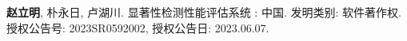 \begin{publications}
\begin{enumerate}[label={[\arabic*]}]
	\item\textbf{赵立明}, 朴永日, 卢湖川.
	显著性检测性能评估系统
	: 中国. 发明类别: 软件著作权. 
	授权公告号: 2023SR0592002, 
	授权公告日: 2023.06.07.
\end{enumerate}	




\end{publications}
